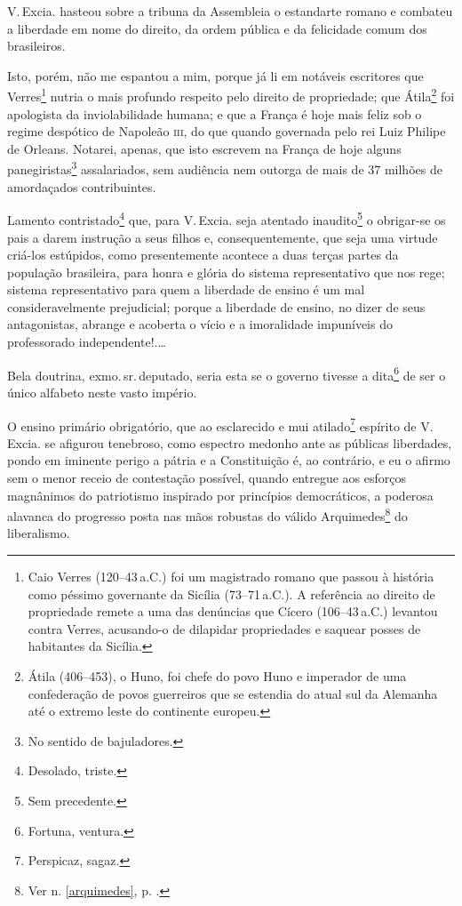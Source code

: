 V.\,Excia. hasteou sobre a tribuna da Assembleia o estandarte romano e
combateu a liberdade em nome do direito, da ordem pública e da
felicidade comum dos brasileiros.

Isto, porém, não me espantou a mim, porque já li em notáveis escritores
que Verres\footnote{Caio Verres (120--43\,a.C.) foi um magistrado romano
  que passou à história como péssimo governante da Sicília (73--71\,a.C.).
  A referência ao direito de propriedade remete a uma das denúncias que
  Cícero (106--43\,a.C.) levantou contra Verres, acusando-o de dilapidar
  propriedades e saquear posses de habitantes da Sicília.} nutria o mais
profundo respeito pelo direito de propriedade; que Átila\footnote{Átila (406--453), 
o Huno, foi chefe do povo Huno e imperador de uma
  confederação de povos guerreiros que se estendia do atual sul da
  Alemanha até o extremo leste do continente europeu.} foi apologista da
inviolabilidade humana; e que a França é hoje mais feliz sob o regime
despótico de Napoleão \textsc{iii}, do que quando governada pelo rei Luiz Philipe
de Orleans. Notarei, apenas, que isto escrevem na França de hoje alguns
panegiristas\footnote{No sentido de bajuladores.} assalariados, sem
audiência nem outorga de mais de 37 milhões de amordaçados
contribuintes.

Lamento contristado\footnote{Desolado, triste.} que, para V.\,Excia.
seja atentado inaudito\footnote{Sem precedente.} o obrigar-se os pais
a darem instrução a seus filhos e, consequentemente, que seja uma
virtude criá-los estúpidos, como presentemente acontece a duas terças
partes da população brasileira, para honra e glória do sistema
representativo que nos rege; sistema representativo para quem a
liberdade de ensino é um mal consideravelmente prejudicial; porque a
liberdade de ensino, no dizer de seus antagonistas, abrange e acoberta o
vício e a imoralidade impuníveis do professorado independente!.\ldots{}

Bela doutrina, exmo.\,sr.\,deputado, seria esta se o governo tivesse a
dita\footnote{Fortuna, ventura.} de ser o único alfabeto neste vasto
império.

O ensino primário obrigatório, que ao esclarecido e mui
atilado\footnote{Perspicaz, sagaz.} espírito de V.\,Excia. se afigurou
tenebroso, como espectro medonho ante as públicas liberdades, pondo em
iminente perigo a pátria e a Constituição é, ao contrário, e eu o afirmo
sem o menor receio de contestação possível, quando entregue aos esforços
magnânimos do patriotismo inspirado por princípios democráticos, a
poderosa alavanca do progresso posta nas mãos robustas do válido
Arquimedes\footnote{Ver n. \ref{arquimedes}, p. \pageref{arquimedes}.} 
do liberalismo.


